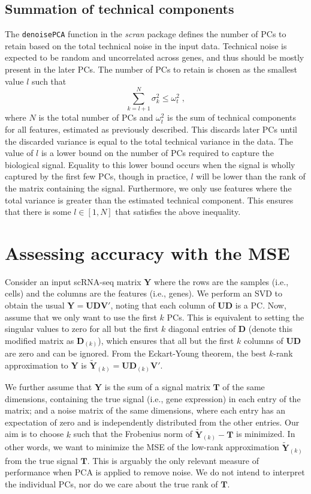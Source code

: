 \documentclass[10pt,letterpaper]{article}
\newcommand\code[1]{{\small\texttt{#1}}}
\begin{document}
\subsection{Summation of technical components}
The \code{denoisePCA} function in the \textit{scran} package \cite{lun2016stepbystep} defines the number of PCs to retain based on the total technical noise in the input data.
Technical noise is expected to be random and uncorrelated across genes, and thus should be mostly present in the later PCs.
The number of PCs to retain is chosen as the smallest value $l$ such that 
\[
    \sum_{k=l+1}^N \sigma^2_k  \le \omega^2_t \;,
\]
where $N$ is the total number of PCs and $\omega^2_t$ is the sum of technical components for all features, estimated as previously described.
This discards later PCs until the discarded variance is equal to the total technical variance in the data.
The value of $l$ is a lower bound on the number of PCs required to capture the biological signal.
Equality to this lower bound occurs when the signal is wholly captured by the first few PCs,
though in practice, $l$ will be lower than the rank of the matrix containing the signal.
Furthermore, we only use features where the total variance is greater than the estimated technical component.
This ensures that there is some $l \in [1, N]$ that satisfies the above inequality.

\section{Assessing accuracy with the MSE}
Consider an input scRNA-seq matrix $\mathbf{Y}$ where the rows are the samples (i.e., cells) and the columns are the features (i.e., genes).
We perform an SVD to obtain the usual $\mathbf{Y} = \mathbf{U}\mathbf{D}\mathbf{V}'$, noting that each column of $\mathbf{U}\mathbf{D}$ is a PC.
Now, assume that we only want to use the first $k$ PCs.
This is equivalent to setting the singular values to zero for all but the first $k$ diagonal entries of $\mathbf{D}$ (denote this modified matrix as $\mathbf{D}_{(k)}$),
which ensures that all but the first $k$ columns of $\mathbf{U}\mathbf{D}$ are zero and can be ignored.
From the Eckart-Young theorem, the best $k$-rank approximation to $\mathbf{Y}$ is $\mathbf{\tilde Y}_{(k)} =  \mathbf{U}\mathbf{D}_{(k)}\mathbf{V}'$.

We further assume that $\mathbf{Y}$ is the sum of a signal matrix $\mathbf{T}$ of the same dimensions, 
containing the true signal (i.e., gene expression) in each entry of the matrix;
and a noise matrix of the same dimensions, where each entry has an expectation of zero and is independently distributed from the other entries.
Our aim is to choose $k$ such that the Frobenius norm of $\mathbf{\tilde Y}_{(k)} - \mathbf{T}$ is minimized.
In other words, we want to minimize the MSE of the low-rank approximation $\mathbf{\tilde Y}_{(k)}$ from the true signal $\mathbf{T}$.
This is arguably the only relevant measure of performance when PCA is applied to remove noise.
We do not intend to interpret the individual PCs, nor do we care about the true rank of $\mathbf{T}$.
\end{document}
